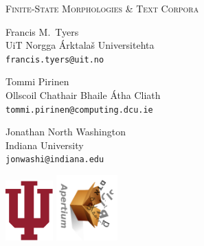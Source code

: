 \documentclass[fontscale=0.33,landscape,paperwidth=48in,paperheight=36in]{baposter}  %
\begin{document}
\begin{poster}
{	}{ %
		{%
			{\titlefont \scshape{Finite-State Morphologies \& Text Corpora\\\vspace{0.2em}}}}
	}{ %
		\vspace{-0.6em}
		\begin{center}
			\begin{minipage}[t]{9em}
				\begin{spacing}{0.4}
				{Francis M.\ Tyers}\\
				{\footnotesize UiT Norgga Árktalaš Universitehta \\\texttt{francis.tyers@uit.no}}
				\end{spacing}
			\end{minipage}
			\begin{minipage}[t]{9.5em}
				\begin{spacing}{0.4}
					{Tommi Pirinen\vphantom{y}}\\
					{\footnotesize Ollscoil Chathair Bhaile Átha Cliath\vphantom{y}\\\texttt{tommi.pirinen@computing.dcu.ie}}
				\end{spacing}
			\end{minipage}
			\begin{minipage}[t]{12em}
				\begin{spacing}{0.4}
					{Jonathan North Washington}\\
					{\footnotesize Indiana University\\\texttt{jonwashi@indiana.edu}}
				\end{spacing}
			\end{minipage}
		\end{center}
	}{ %
		\includegraphics[height=6.25em]{iu_tab-crop}
		\hspace{2.5cm}\includegraphics[angle=90,height=6.8em]{apertium5b}%
	}


\end{poster}
\end{document}
